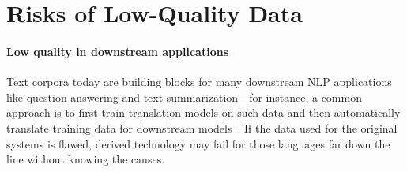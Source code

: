 
\section{Risks of Low-Quality Data}\label{sec:risk}


\paragraph{Low quality in downstream applications}
Text corpora today are building blocks for many downstream NLP applications like question answering and text summarization---for instance, a common approach is to first train translation models on such data and then automatically translate training data for downstream models~\citep{conneau-etal-2018-xnli}. If the data used for the original systems is flawed, derived technology may fail for those languages far down the line without knowing the causes.



